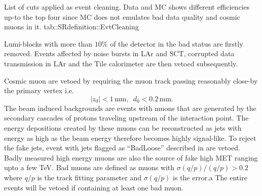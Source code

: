 {List of cuts applied as event cleaning. Data and MC shows different efficiencies up-to the top four since MC does not emulates bad data quality and cosmic muons in it.}
{tab::SRdefinition::EvtCleaning}

Lumi-blocks with more than $10\%$ of the detector in the bad status are firstly removed. 
Events affected by noise bursts in LAr and SCT,  corrupted data transmission in LAr and the Tile calorimeter are then vetoed subsequently. 

Cosmic muon are vetoed by requiring the muon track passing reasonably close-by the primary vertex i.e.
$$
|z_0| < 1\, \mathrm{mm}, \,\,\, d_0<0.2\, \mathrm{mm}.
$$
The beam induced backgrounds are events with muons that are generated by the secondary cascades of protons traveling upstream of the interaction point. The energy depositions created by these muons can be reconstructed as jets with energy as high as the beam energy therefore becomes highly signal-like. To reject the fake jets, event with jets flagged as ``BadLoose'' described in \cite{BadJetCriteriaATLAS2015} are vetoed. \\

Badly measured high energy muons are also the source of fake high MET ranging upto a few TeV.
Bad muons are defined as muons with $\sigma(q/p) / (q/p) > 0.2$ where $q/p$ is the track fitting parameter and $\sigma(q/p)$ is the error.a
The entire events will be vetoed if containing at least one bad muon.


